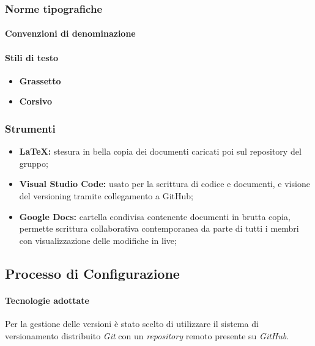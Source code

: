 	\subsubsection{Norme tipografiche}
		\paragraph{Convenzioni di denominazione}   
		\paragraph{Stili di testo} %
			\begin{itemize}
				\item \textbf{Grassetto}
				\item \textbf{Corsivo}
			\end{itemize}
	
						
		
		\subsubsection{Strumenti}
			\begin{itemize}
				\item \textbf{LaTeX:} stesura in bella copia dei documenti caricati poi sul repository del gruppo;
				\item \textbf{Visual Studio Code:} usato per la scrittura di codice e documenti, e visione del versioning tramite collegamento a GitHub;
				\item \textbf{Google Docs:} cartella condivisa contenente documenti in brutta copia, permette scrittura collaborativa contemporanea da parte di tutti i membri con visualizzazione delle modifiche in live;
			\end{itemize}
		
	\subsection{Processo di Configurazione}
		\paragraph{Tecnologie adottate}
			Per la gestione delle versioni è stato scelto di utilizzare il sistema di versionamento distribuito \emph{Git} con un \emph{repository} remoto presente su \emph{GitHub}. %
